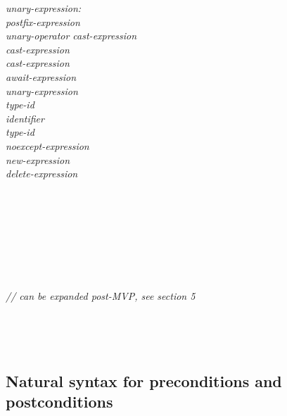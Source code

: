 \begin{adjustwidth}{0.5cm}{0.5cm}
\emph{unary-expression:} \\
\phantom{~~~}\emph{postfix-expression} \\
\phantom{~~~}\emph{unary-operator cast-expression} \\
\phantom{~~~}\tcode{++} \emph{cast-expression} \\
\phantom{~~~}\tcode{--} \emph{cast-expression} \\
\phantom{~~~}\emph{await-expression} \\
\phantom{~~~} \emph{unary-expression} \\
\phantom{~~~} \emph{type-id} \tcode{)} \\
\phantom{~~~} \emph{identifier} \tcode{)} \\
\phantom{~~~} \emph{type-id} \tcode{)} \\
\phantom{~~~}\emph{noexcept-expression} \\
\phantom{~~~}\emph{new-expression} \\
\phantom{~~~}\emph{delete-expression} \\
\phantom{~~~}

 \\
\phantom{~~~} \\
\phantom{~~~}

 \\
\phantom{~~~}

 \\
\phantom{~~~}

 \\
\phantom{~~~} \phantom{~~~}\emph{// can be expanded post-MVP, see section 5}

 \\
\phantom{~~~}

 \\
\phantom{~~~}

\end{adjustwidth}

\subsection{Natural syntax for preconditions and postconditions}

